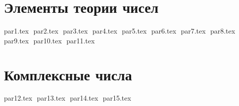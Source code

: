 



\gdef\CourseName{Алгебра}
\author{Лектор: Жуков Игорь Борисович} 
\date{}

\makefirstpages

\section*{Элементы теории чисел}

{par1.tex}
$ $
{par2.tex}
$ $
{par3.tex}
$ $
{par4.tex}
$ $
{par5.tex}
$ $
{par6.tex}
$ $
{par7.tex}
$ $
{par8.tex}
$ $
{par9.tex}
$ $
{par10.tex}
$ $
{par11.tex}
$ $
\pagebreak

\section*{Комплексные числа}

{par12.tex}
$ $
{par13.tex}
$ $
{par14.tex}
$ $
{par15.tex}
$ $

 